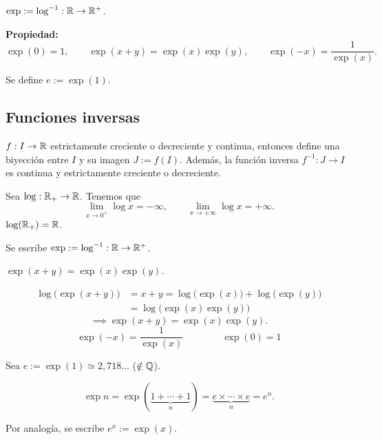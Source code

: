 \documentclass[11pt,a4paper]{article}
\begin{document}
\begin{definicion}
$\exp:=\log^{-1}:\mathbb{R}\to\mathbb{R}^+$.
\end{definicion}

\textbf{Propiedad:}
\[
  \exp(0)=1,\qquad \exp(x+y)=\exp(x)\exp(y),\qquad \exp(-x)=\frac{1}{\exp(x)}.
\]

Se define $e:=\exp(1)$.



\subsection{Funciones inversas}

$f:I\to\mathbb{R}$ estrictamente creciente o decreciente y continua, entonces define una biyección entre $I$ y su imagen $J:=f(I)$. Además, la función inversa $f^{-1}:J\to I$ es continua y estrictamente creciente o decreciente.

\begin{ejemplo}
Sea $\log:\mathbb{R}_+\to\mathbb{R}$. Tenemos que
\[
  \lim_{x\to0^+}\log x=-\infty,\qquad \lim_{x\to+\infty}\log x=+\infty.
\]
$\log(\mathbb{R}_+)=\mathbb{R}$.

Se escribe $\exp:=\log^{-1}:\mathbb{R}\to\mathbb{R}^+$.
\end{ejemplo}

\begin{proposicion}
$\exp(x+y)=\exp(x)\exp(y)$.
\end{proposicion}

\begin{align*}
  \log\big(\exp(x+y)\big) &= x+y = \log\big(\exp(x)\big)+\log\big(\exp(y)\big)\\
  &= \log\big(\exp(x)\exp(y)\big)
\end{align*}
\[
  \implies \exp(x+y)=\exp(x)\exp(y).
\]
\[
  \exp(-x)=\frac{1}{\exp(x)}\qquad\qquad \exp(0)=1
\]

\begin{definicion}
Sea $e:=\exp(1)\simeq 2{,}718\ldots$ \quad ($\notin\mathbb{Q}$).
\end{definicion}

\begin{proposicion}
\[
  \exp n=\exp(\underbrace{1+\cdots+1}_{n})=\underbrace{e\times\cdots\times e}_{n}=e^n.
\]
\end{proposicion}

Por analogía, se escribe $e^x:=\exp(x)$.
\end{document}
